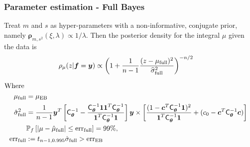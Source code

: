 \documentclass[handout, 10pt,compress,xcolor={usenames,dvipsnames}]{beamer} %
\newcommand{\bm}[1]{\boldsymbol{#1}}
\newcommand{\MLE}{\textup{EB}}
\newcommand{\full}{\textup{full}}
\newcommand{\mCthetaInv}{{\mathsf{C}^{-1}_{\vtheta}}}
\newcommand{\D}[1]{\text{d}{#1}}
\newcommand{\vrho}{\bm{\rho}}
\newcommand{\err}{{\text{err}}}
\renewcommand{\vtheta}{{\bm{\theta}}}
\newcommand{\pause}{}
\begin{document}
\appendix






\begin{frame}
	\frametitle{Parameter estimation - Full Bayes}
	\vspace*{-6ex}
	Treat $m$ and $s$ as hyper-parameters with a non-informative, conjugate prior, namely $\vrho_{m,s^2}(\xi, \lambda) \propto 1/\lambda$.
	Then the posterior density for the integral $\mu$ given the data is
	\vspace*{-2.0ex}
	\begin{align*}
	\rho_{\mu}(z | \vf = \vy) 
	& \propto \left(1 +  \frac{1}{n-1} \frac{(z - \mu_{\full})^2}{\widehat{\sigma}_{\full}^2} \right)^{-n/2}
	\end{align*}
	\pause
	\vspace{-4ex}
	\begin{align*}
	\text{Where} \;
	\\
	\mu_{\full} &= \mu_\MLE
	\\
	\hsigma^2_{\full} 
	& = \frac{1}{n-1}
	\vy^T\left[ \mCthetaInv 
	- \frac{ \mCthetaInv \vone\vone^T \mCthetaInv}{\vone^T \mCthetaInv \vone}  \right]\vy
	\times  \left[\frac{(1 - \vc^T \mCthetaInv \vone)^2}{\vone^T \mCthetaInv \vone} + (c_0  -\vc ^T \mCthetaInv \vc) \right]
	\\ &\mathbb{P}_f \left[ |\mu-\hmu_{\full}|  \leq \err_{\full} \right]  = 99\%,
	\\ \err_{\full} &:= t_{n-1,0.995} \hat{\sigma}_{\full} > \err_{\MLE}
	\end{align*}
\end{frame}
\end{document}

